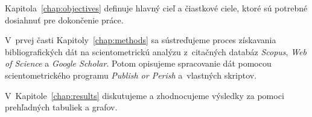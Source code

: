 Kapitola~\ref{chap:objectives} definuje hlavný cieľ a čiastkové ciele, ktoré sú
potrebné dosiahnuť pre dokončenie práce.

V~prvej časti Kapitoly~\ref{chap:methods} sa sústreďujeme proces získavania
bibliografických dát na scientometrickú analýzu z~citačných databáz
\emph{Scopus}, \emph{Web of Science} a \emph{Google Scholar}.  Potom opisujeme
spracovanie dát pomocou scientometrického programu \emph{Publish or Perish}
a~vlastných skriptov.

V~Kapitole~\ref{chap:results} diskutujeme a zhodnocujeme výsledky za pomoci
prehľadných tabuliek a grafov.

